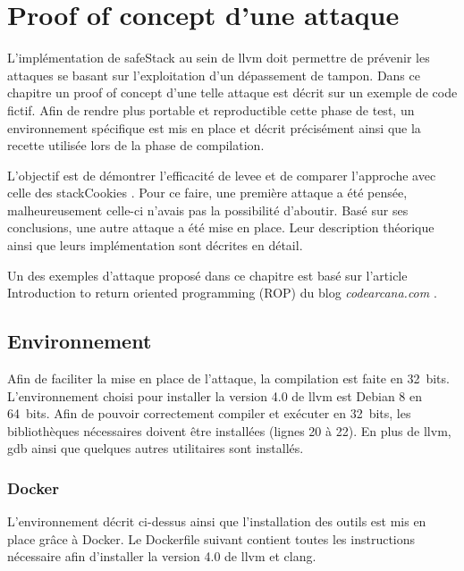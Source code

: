 \chapter{Proof of concept d'une attaque}
\label{chap:attaque}

L'implémentation de \og \gls{safeStack} \fg au sein de \gls{llvm} doit permettre de prévenir les attaques se basant sur l'exploitation d'un dépassement de tampon. Dans ce chapitre un \og proof of concept \fg d'une telle attaque est décrit sur un exemple de code fictif. Afin de rendre plus portable et reproductible cette phase de test, un environnement spécifique est mis en place et décrit précisément ainsi que la recette utilisée lors de la phase de compilation.

L'objectif est de démontrer l'efficacité de \gls{levee} et de comparer l'approche avec celle des \og \gls{stackCookies} \fg. Pour ce faire, une première attaque a été pensée, malheureusement celle-ci n'avais pas la possibilité d'aboutir. Basé sur ses conclusions, une autre attaque a été mise en place. Leur description théorique ainsi que leurs implémentation sont décrites en détail.

Un des exemples d'attaque proposé dans ce chapitre est basé sur l'article \og Introduction to return oriented programming (ROP) \fg du blog \textit{codearcana.com} \cite{IntroductionToROP}.

\minitoc

\newpage

\section{Environnement}

Afin de faciliter la mise en place de l'attaque, la compilation est faite en 32~bits. L'environnement choisi pour installer la version 4.0 de \gls{llvm} est Debian 8 en 64~bits. Afin de pouvoir correctement compiler et exécuter en 32~bits, les bibliothèques nécessaires doivent être installées (lignes 20 à 22). En plus de \gls{llvm}, \gls{gdb} ainsi que quelques autres utilitaires sont installés.

\subsection{Docker}

L'environnement décrit ci-dessus ainsi que l'installation des outils est mis en place grâce à Docker. Le Dockerfile suivant contient toutes les instructions nécessaire afin d'installer la version 4.0 de \gls{llvm} et \gls{clang}.

